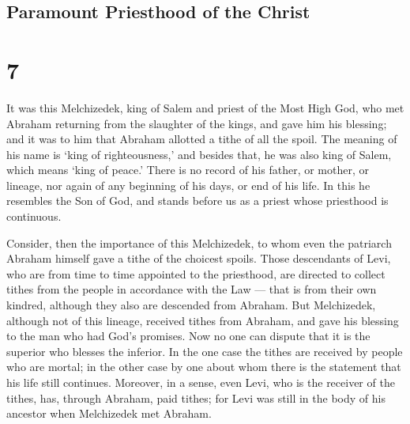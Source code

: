 \hypertarget{paramount-priesthood-of-the-christ}{%
\subsection{Paramount Priesthood of the
Christ}\label{paramount-priesthood-of-the-christ}}

\hypertarget{section-6}{%
\section{7}\label{section-6}}

 It was this Melchizedek, king of Salem and priest of the
Most High God, who met Abraham returning from the slaughter of the
kings, and gave him his blessing;  and it was to him that
Abraham allotted a tithe of all the spoil. The meaning of his name is
`king of righteousness,' and besides that, he was also king of Salem,
which means `king of peace.'  There is no record of his
father, or mother, or lineage, nor again of any beginning of his days,
or end of his life. In this he resembles the Son of God, and stands
before us as a priest whose priesthood is continuous.

 Consider, then the importance of this Melchizedek, to whom
even the patriarch Abraham himself gave a tithe of the choicest spoils.
 Those descendants of Levi, who are from time to time
appointed to the priesthood, are directed to collect tithes from the
people in accordance with the Law --- that is from their own kindred,
although they also are descended from Abraham.  But
Melchizedek, although not of this lineage, received tithes from Abraham,
and gave his blessing to the man who had God's promises. 
Now no one can dispute that it is the superior who blesses the inferior.
 In the one case the tithes are received by people who are
mortal; in the other case by one about whom there is the statement that
his life still continues.  Moreover, in a sense, even Levi,
who is the receiver of the tithes, has, through Abraham, paid tithes;
 for Levi was still in the body of his ancestor when
Melchizedek met Abraham.

